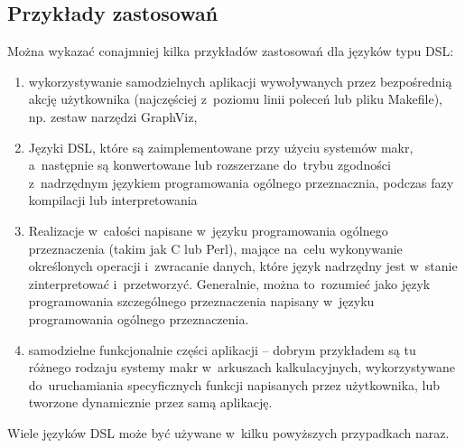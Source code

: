 \documentclass[a4paper,12pt,oneside]{report}
\begin{document}
\subsection{Przykłady zastosowań}
\label{sub:zastosowania}

Można wykazać conajmniej kilka przykładów zastosowań dla języków typu DSL:
\begin{enumerate}
  \item wykorzystywanie samodzielnych aplikacji wywoływanych przez bezpośrednią akcję użytkownika (najczęściej z~poziomu linii poleceń lub pliku Makefile), np. zestaw narzędzi GraphViz,
  \item Języki DSL, które są zaimplementowane przy użyciu systemów makr, a~następnie są konwertowane lub rozszerzane do~trybu zgodności z~nadrzędnym językiem programowania ogólnego przeznacznia, podczas fazy kompilacji lub interpretowania
  \item Realizacje w~całości napisane w~języku programowania ogólnego przeznaczenia (takim jak C lub Perl), mające na~celu wykonywanie określonych operacji i~zwracanie danych, które język nadrzędny jest w~stanie zinterpretować i~przetworzyć. Generalnie, można to~rozumieć jako język programowania szczególnego przeznaczenia napisany w~języku programowania ogólnego przeznaczenia.
  \item samodzielne funkcjonalnie części aplikacji -- dobrym przykładem są tu różnego rodzaju systemy makr w~arkuszach kalkulacyjnych, wykorzystywane do~uruchamiania specyficznych funkcji napisanych przez użytkownika, lub tworzone dynamicznie przez samą aplikację.
\end{enumerate}

Wiele języków DSL może być używane w~kilku powyższych przypadkach naraz.
\end{document}
